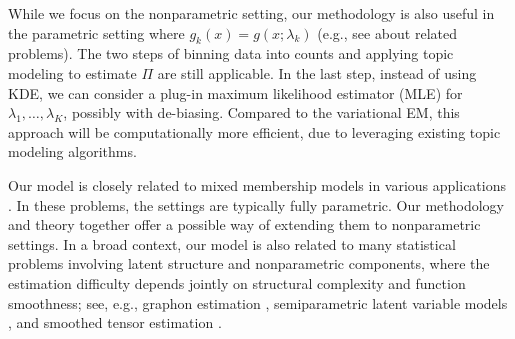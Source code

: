 \documentclass[preprint,11pt]{article}
\numberwithin{equation}{section}
\begin{document}
While we focus on the nonparametric setting, our methodology is also useful in the parametric setting where $g_k(x)=g(x; \lambda_k)$ (e.g., see \cite{zhang2009generalized, doss2023optimal} about related problems).  
The two steps of binning data into counts and applying topic modeling to estimate $\Pi$ are still applicable. 
In the last step, instead of using KDE, we can consider a plug-in maximum likelihood estimator (MLE) for $\lambda_1,\ldots, \lambda_K$, possibly with de-biasing. Compared to the variational EM, this approach will be computationally more efficient, due to leveraging existing topic modeling algorithms. 


Our model is closely related to mixed membership models in various applications \citep{agterberg2025estimating,ma2021determining}. 
In these problems, the settings are typically fully parametric. 
Our methodology and theory together offer a possible way of extending them to nonparametric settings. 
In a broad context, our model is also related to many statistical problems involving latent structure and nonparametric components, where the estimation difficulty depends jointly on structural complexity and function smoothness; see, e.g., graphon estimation \citep{gao2015rate}, semiparametric latent variable models \citep{liu2012high}, and smoothed tensor estimation \citep{lee2025statistical, han2024tensor}. 



\end{document}
